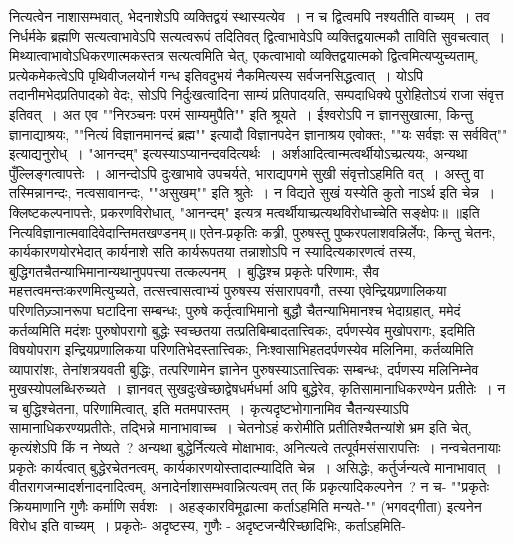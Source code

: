 नित्यत्वेन नाशासम्भवात्, भेदनाशेऽपि व्यक्तिद्वयं स्थास्यत्येव~। न च द्वित्वमपि नश्यतीति वाच्यम्~। तव निर्धर्मके ब्रह्मणि सत्यत्वाभावेऽपि सत्यत्वरूपं तदितिवत्
द्वित्वाभावेऽपि व्यक्तिद्वयात्मकौ ताविति सुवचत्वात्~। मिथ्यात्वाभावोऽधिकरणात्मकस्तत्र सत्यत्वमिति चेत्, एकत्वाभावो व्यक्तिद्वयात्मको द्वित्वमित्यप्युच्यताम्, प्रत्येकमेकत्वेऽपि
पृथिवीजलयोर्न गन्ध इतिवदुभयं नैकमित्यस्य सर्वजनसिद्धत्वात्~। योऽपि तदानीमभेदप्रतिपादको वेदः, सोऽपि निर्दुःखत्वादिना साम्यं प्रतिपादयति, सम्पदाधिक्ये पुरोहितोऽयं
राजा संवृत्त इतिवत्~। अत एव ""निरञ्चनः परमं साम्यमुपैति"" इति श्रूयते~। ईश्वरोऽपि न ज्ञानसुखात्मा, किन्तु ज्ञानाद्याश्रयः, ""नित्यं विज्ञानमानन्दं ब्रह्म"" इत्यादौ
विज्ञानपदेन ज्ञानाश्रय एवोक्तः, ""यः सर्वज्ञः स सर्ववित्"" इत्याद्यनुरोध्~। "आनन्दम्" इत्यस्याऽप्यानन्दवदित्यर्थः~। अर्शआदित्वान्मत्वर्थीयोऽच्प्रत्ययः, अन्यथा पुँल्लिङ्गत्वापत्तेः~।
आनन्दोऽपि दुःखाभावे उपचर्यते, भाराद्यपगमे सुखी संवृत्तोऽहमिति वत्~। अस्तु वा तस्मिन्नानन्दः, नत्वसावानन्दः, ""असुखम्"" इति श्रुतेः~। न विद्यते सुखं यस्येति कुतो
नाऽर्थ इति चेन्न~। क्लिष्टकल्पनापत्तेः, प्रकरणविरोधात्, "आनन्दम्" इत्यत्र मत्वर्थीयाच्प्रत्यथविरोधाच्चेति सङ्क्षेपः॥
॥इति नित्यविज्ञानात्मवादिवेदान्तिमतखण्डनम्॥
एतेन-प्रकृतिः कत्र्री, पुरुषस्तु पुष्करपलाशवन्निर्लेपः, किन्तु चेतनः, कार्यकारणयोरभेदात् कार्यनाशे सति कार्यरूपतया तन्नाशोऽपि न स्यादित्यकारणत्वं तस्य,
बुद्धिगतचैतन्याभिमानान्यथानुपपत्त्या तत्कल्पनम्~। बुद्धिश्च प्रकृतेः परिणामः, सैव महत्तत्वमन्तःकरणमित्युच्यते, तत्सत्त्वासत्वाभ्यं पुरुषस्य संसारापवगौ, तस्या एवेन्द्रियप्रणालिकया
परिणतिज्र्ञानरूपा घटादिना सम्बन्धः, पुरुषे कर्तृत्वाभिमानो बुद्धौ चैतन्याभिमानश्च भेदाग्रहात्, ममेदं कर्तव्यमिति मदंशः पुरुषोपरागो बुद्धेः स्वच्छतया तत्प्रतिबिम्बादतात्त्विकः,
दर्पणस्येव मुखोपरागः, इदमिति विषयोपराग इन्द्रियप्रणालिकया परिणतिभेदस्तात्त्विकः, निःश्वासाभिहतदर्पणस्येव मलिनिमा, कर्तव्यमिति व्यापारांशः, तेनांशत्रयवती बुद्धिः,
तत्परिणामेन ज्ञानेन पुरुषस्याऽतात्त्विकः सम्बन्धः, दर्पणस्य मलिनिम्नेव मुखस्योपलब्धिरुच्यते~। ज्ञानवत् सुखदुःखेच्छाद्वेषधर्मधर्मा अपि बुद्धेरेव, कृतिसामानाधिकरण्येन
प्रतीतेः~। न च बुद्धिश्चेतना, परिणामित्वात्, इति मतमपास्तम्~।
कृत्यदृष्टभोगानामिव चैेतन्यस्याऽपि सामानाधिकरण्यप्रतीतेः, तद्भिन्ने मानाभावाच्च~। चेतनोऽहं करोमीति प्रतीतिश्चैतन्यांशे भ्रम इति चेत्, कृत्यंशेऽपि किं न
नेष्यते~? अन्यथा बुद्धेर्नित्यत्वे मोक्षाभावः, अनित्यत्वे तत्पूर्वमसंसारापत्तिः~। नन्वचेतनायाः प्रकृतेः कार्यत्वात् बुद्धेरचेतनत्वम्, कार्यकारणयोस्तादात्म्यादिति चेन्न~। असिद्धेः,
कर्तुर्जन्यत्वे मानाभावात्~। वीतरागजन्मादर्शनादनादित्वम्, अनादेर्नाशासम्भवान्नित्यत्वम् तत् किं प्रकृत्यादिकल्पनेन~? न च-
""प्रकृतेः क्रियमाणानि गुणैः कर्माणि सर्वशः~।
अहङ्कारविमूढात्मा कर्ताऽहमिति मन्यते-"" (भगवद्गीता) इत्यनेन विरोध इति वाच्यम्~। प्रकृतेः- अदृष्टस्य, गुणैः - अदृष्टजन्यैरिच्छादिभिः, कर्ताऽहमिति-
